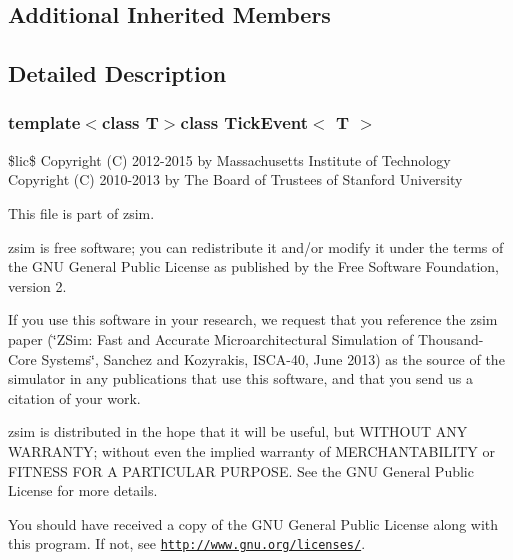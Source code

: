 \subsection*{Additional Inherited Members}


\subsection{Detailed Description}
\subsubsection*{template$<$class T$>$class Tick\-Event$<$ T $>$}

\$lic\$ Copyright (C) 2012-\/2015 by Massachusetts Institute of Technology Copyright (C) 2010-\/2013 by The Board of Trustees of Stanford University

This file is part of zsim.

zsim is free software; you can redistribute it and/or modify it under the terms of the G\-N\-U General Public License as published by the Free Software Foundation, version 2.

If you use this software in your research, we request that you reference the zsim paper (\char`\"{}\-Z\-Sim\-: Fast and Accurate Microarchitectural Simulation of
\-Thousand-\/\-Core Systems\char`\"{}, Sanchez and Kozyrakis, I\-S\-C\-A-\/40, June 2013) as the source of the simulator in any publications that use this software, and that you send us a citation of your work.

zsim is distributed in the hope that it will be useful, but W\-I\-T\-H\-O\-U\-T A\-N\-Y W\-A\-R\-R\-A\-N\-T\-Y; without even the implied warranty of M\-E\-R\-C\-H\-A\-N\-T\-A\-B\-I\-L\-I\-T\-Y or F\-I\-T\-N\-E\-S\-S F\-O\-R A P\-A\-R\-T\-I\-C\-U\-L\-A\-R P\-U\-R\-P\-O\-S\-E. See the G\-N\-U General Public License for more details.

You should have received a copy of the G\-N\-U General Public License along with this program. If not, see \href{http://www.gnu.org/licenses/}{\tt http\-://www.\-gnu.\-org/licenses/}. 

